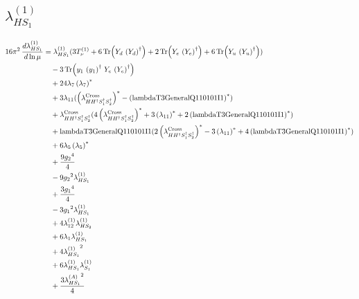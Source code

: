 \documentclass[10pt,a4paper]{article}
\begin{document}
\subsection*{$\lambda_{HS_1}^{(1)}$}
\begin{align*}
16\pi^2\,\frac{d \lambda_{HS_1}^{(1)}}{d\ln\mu} &={\lambda_{HS_1}^{(1)}} (3 T_{\nu}^{(1)}+6 \operatorname{Tr}\!\left({Y_d}\,\left({Y_d}\right)^{\dagger}\right)+2 \operatorname{Tr}\!\left({Y_e}\,\left({Y_e}\right)^{\dagger}\right)+6 \operatorname{Tr}\!\left({Y_u}\,\left({Y_u}\right)^{\dagger}\right)) \\
&\quad -3 \operatorname{Tr}\!\left({y_1}\,\left({y_1}\right)^{\dagger}\,{Y_e}\,\left({Y_e}\right)^{\dagger}\right) \\
&\quad +24 {\lambda_{7}} \left({\lambda_{7}}\right)^{*} \\
&\quad +3 {\lambda_{11}} (\left({\lambda_{H H^\dagger S_1^\dagger S_2^\dagger}^{\rm Cross}}\right)^{*}-\left(\text{lambdaT3GeneralQ110101I1}\right)^{*}) \\
&\quad +{\lambda_{H H^\dagger S_1^\dagger S_2^\dagger}^{\rm Cross}} (4 \left({\lambda_{H H^\dagger S_1^\dagger S_2^\dagger}^{\rm Cross}}\right)^{*}+3 \left({\lambda_{11}}\right)^{*}+2 \left(\text{lambdaT3GeneralQ110101I1}\right)^{*}) \\
&\quad +\text{lambdaT3GeneralQ110101I1} (2 \left({\lambda_{H H^\dagger S_1^\dagger S_2^\dagger}^{\rm Cross}}\right)^{*}-3 \left({\lambda_{11}}\right)^{*}+4 \left(\text{lambdaT3GeneralQ110101I1}\right)^{*}) \\
&\quad +6 {\lambda_5} \left({\lambda_5}\right)^{*} \\
&\quad +\frac{9 {g_2}^4}{4} \\
&\quad -9 {g_2}^2 {\lambda_{HS_1}^{(1)}} \\
&\quad +\frac{3 {g_1}^4}{4} \\
&\quad -3 {g_1}^2 {\lambda_{HS_1}^{(1)}} \\
&\quad +4 {\lambda_{12}^{(1)}} {\lambda_{HS_2}^{(1)}} \\
&\quad +6 {\lambda_1} {\lambda_{HS_1}^{(1)}} \\
&\quad +4 {\lambda_{HS_1}^{(1)}}^2 \\
&\quad +6 {\lambda_{HS_1}^{(1)}} {\lambda_{S_1}^{(1)}} \\
&\quad +\frac{3 {\lambda_{HS_1}^{(A)}}^2}{4} \\
\end{align*}
\end{document}
